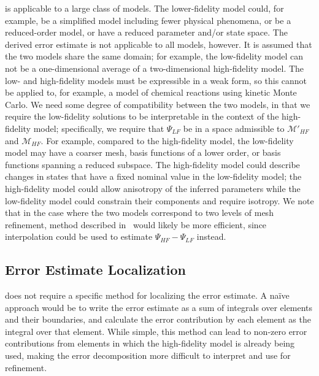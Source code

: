  is applicable to a large class of models. The lower-fidelity model could, for example, be a simplified model including fewer physical phenomena, or be a reduced-order model, or have a reduced parameter and/or state space. The derived error estimate is not applicable to all models, however. It is assumed that the two models share the same domain; for example, the low-fidelity model can not be a one-dimensional average of a two-dimensional high-fidelity model. The low- and high-fidelity models must be expressible in a weak form, so this cannot be applied to, for example, a model of chemical reactions using kinetic Monte Carlo. We need some degree of compatibility between the two models, in that we require the low-fidelity solutions to be interpretable in the context of the high-fidelity model; specifically, we require that $\Psi_{LF}$ be in a space admissible to $\mathcal{M}'_{HF}$ and $\mathcal{M}_{HF}$. For example, compared to the high-fidelity model, the low-fidelity model may have a coarser mesh, basis functions of a lower order, or basis functions spanning a reduced subspace. The high-fidelity model could describe changes in states that have a fixed nominal value in the low-fidelity model; the high-fidelity model could allow anisotropy of the inferred parameters while the low-fidelity model could constrain their components and require isotropy. We note that in the case where the two models correspond to two levels of mesh refinement, method described in~\cite{BecVex05} would likely be more efficient, since interpolation could be used to estimate $\Psi_{HF}-\Psi_{LF}$ instead.

\subsection{Error Estimate Localization}\label{sec:errLocal}

 does not require a specific method for localizing the error estimate. A na\"{i}ve approach would be to write the error estimate as a sum of integrals over elements and their boundaries, and calculate the error contribution by each element as the integral over that element. While simple, this method can lead to non-zero error contributions from elements in which the high-fidelity model is already being used, making the error decomposition more difficult to interpret and use for refinement.

